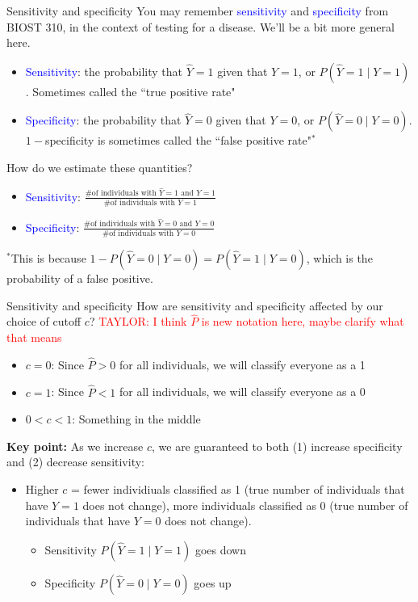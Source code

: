 \documentclass[10pt,t]{beamer}
\begin{document}
\begin{frame}{Sensitivity and specificity}
	You may remember \textcolor{blue}{sensitivity} and \textcolor{blue}{specificity} from BIOST 310, in the context of testing for a disease. We'll be a bit more general here. \pause
	\begin{itemize}
		\item \textcolor{blue}{Sensitivity}: the probability that $\hat{Y} = 1$ given that $Y = 1$, or $P(\hat{Y}= 1 \mid Y = 1)$. Sometimes called the ``true positive rate"\pause
		\item \textcolor{blue}{Specificity}: the probability that $\hat{Y}= 0$ given that $Y = 0$, or $P(\hat{Y} = 0 \mid Y = 0)$. $1 - $specificity is sometimes called the ``false positive rate"$^*$\pause
	\end{itemize}
	How do we estimate these quantities?\pause
	\begin{itemize}
		\item \textcolor{blue}{Sensitivity}: $\frac{\text{\# of individuals with }\hat{Y}= 1 \text{ and } Y = 1}{\text{\# of individuals with }Y = 1}$\pause
		\item \textcolor{blue}{Specificity}: $\frac{\text{\# of individuals with }\hat{Y}= 0 \text{ and } Y = 0}{\text{\# of individuals with }Y = 0}$\pause
	\end{itemize}
\vfill
	\footnotesize $^*$This is because $1 - P(\hat{Y}= 0 \mid Y = 0) = P(\hat{Y}= 1 \mid Y = 0)$, which is the probability of a false positive. 
\end{frame}

\begin{frame}{Sensitivity and specificity}
	How are sensitivity and specificity affected by our choice of cutoff $c$? \pause \textcolor{red}{TAYLOR: I think $\hat{P}$ is new notation here, maybe clarify what that means}
	\begin{itemize}
		\item $c = 0$: Since $\hat{P} > 0$ for all individuals, we will classify everyone as a 1\pause
		\item $c = 1$: Since $\hat{P} < 1$ for all individuals, we will classify everyone as a 0\pause
		\item $0 < c < 1$: Something in the middle \pause
	\end{itemize}
	\textbf{Key point:} As we increase $c$, we are guaranteed to both (1) increase specificity and (2) decrease sensitivity: \pause
	\begin{itemize}
		\item Higher $c$  = fewer individiuals classified as 1 (true number of individuals that have $Y = 1$ does not change), more individuals classified as 0 (true number of individuals that have $Y = 0$ does not change). \pause
		\begin{itemize}
			\item Sensitivity $P(\hat{Y}= 1 \mid Y = 1)$ goes down \pause
			\item Specificity $P(\hat{Y}= 0 \mid Y = 0)$ goes up
		\end{itemize}
	\end{itemize}
\end{frame}
\end{document}
